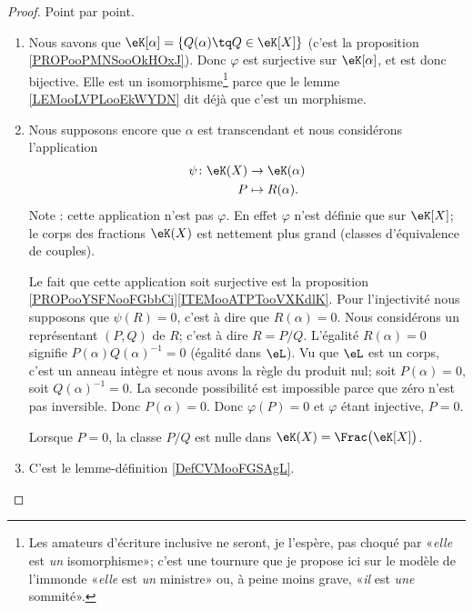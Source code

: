 \begin{proof}
    Point par point.
    \begin{enumerate}
        \item
            Nous savons que \( \eK[\alpha]=\{ Q(\alpha)\tq Q\in \eK[X] \}\) (c'est la proposition \ref{PROPooPMNSooOkHOxJ}). Donc \( \varphi\) est surjective sur \( \eK[\alpha]\), et est donc bijective. Elle est un isomorphisme\footnote{Les amateurs d'écriture inclusive ne seront, je l'espère, pas choqué par «\emph{elle} est \emph{un} isomorphisme»; c'est une tournure que je propose ici sur le modèle de l'immonde «\emph{elle} est \emph{un} ministre» ou, à peine moins grave, «\emph{il} est \emph{une} sommité».} parce que le lemme \ref{LEMooLVPLooEkWYDN} dit déjà que c'est un morphisme.
        \item
            Nous supposons encore que \( \alpha\) est transcendant et nous considérons l'application
            \begin{equation}
                \begin{aligned}
                    \psi\colon \eK(X)&\to \eK(\alpha) \\
                    P&\mapsto R(\alpha). 
                \end{aligned}
            \end{equation}
            Note : cette application n'est pas \( \varphi\). En effet \( \varphi\) n'est définie que sur \( \eK[X]\); le corps des fractions \( \eK(X)\) est nettement plus grand (classes d'équivalence de couples).

            Le fait que cette application soit surjective est la proposition \ref{PROPooYSFNooFGbbCi}\ref{ITEMooATPTooVXKdlK}. Pour l'injectivité nous supposons que \( \psi(R)=0\), c'est à dire que \( R(\alpha)=0\). Nous considérons un représentant \( (P,Q)\) de \( R\); c'est à dire \( R=P/Q\). L'égalité \( R(\alpha)=0\) signifie \( P(\alpha)Q(\alpha)^{-1}=0\) (égalité dans \( \eL\)). Vu que \( \eL\) est un corps, c'est un anneau intègre et nous avons la règle du produit nul; soit \( P(\alpha)=0\), soit \( Q(\alpha)^{-1}=0\). La seconde possibilité est impossible parce que zéro n'est pas inversible. Donc \( P(\alpha)=0\). Donc \( \varphi(P)=0\) et \( \varphi\) étant injective, \( P=0\).

            Lorsque \( P=0\), la classe \( P/Q\) est nulle dans \( \eK(X)= \Frac\big(\eK[X]\big)\).

        \item

            C'est le lemme-définition \ref{DefCVMooFGSAgL}.
    \end{enumerate}
\end{proof}


